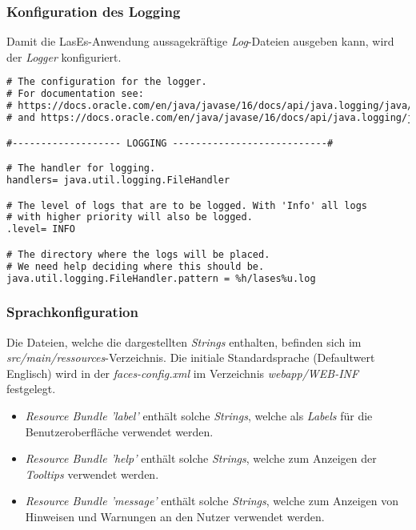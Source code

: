 \subsubsection{Konfiguration des Logging}
Damit die LasEs-Anwendung aussagekräftige \emph{Log}-Dateien ausgeben kann,
wird der \emph{Logger} konfiguriert.

\begin{lstlisting}[language=XML, caption = Die Loggingkonfiguration \emph{logger.properties}]
# The configuration for the logger.
# For documentation see:
# https://docs.oracle.com/en/java/javase/16/docs/api/java.logging/java/util/logging/FileHandler.html
# and https://docs.oracle.com/en/java/javase/16/docs/api/java.logging/java/util/logging/ConsoleHandler.html

#------------------- LOGGING ---------------------------#

# The handler for logging.
handlers= java.util.logging.FileHandler

# The level of logs that are to be logged. With 'Info' all logs
# with higher priority will also be logged.
.level= INFO

# The directory where the logs will be placed.
# We need help deciding where this should be.
java.util.logging.FileHandler.pattern = %h/lases%u.log
\end{lstlisting}

\subsubsection{Sprachkonfiguration}
Die Dateien, welche die dargestellten \emph{Strings} enthalten, befinden sich im
\emph{src/main/ressources}-Verzeichnis.
Die initiale Standardsprache (Defaultwert Englisch) wird in der \emph{faces-config.xml} im
Verzeichnis \emph{webapp/WEB-INF} festgelegt.

\begin{itemize}
    \item \emph{Resource Bundle 'label'} enthält solche \emph{Strings}, welche als \emph{Labels} für die Benutzeroberfläche verwendet
    werden.
    \item \emph{Resource Bundle 'help'} enthält solche \emph{Strings}, welche zum Anzeigen der \emph{Tooltips} verwendet
    werden.
    \item \emph{Resource Bundle 'message'} enthält solche \emph{Strings}, welche zum Anzeigen von Hinweisen und Warnungen
    an den Nutzer verwendet werden.
\end{itemize}

